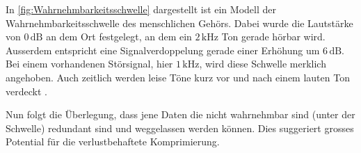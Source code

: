 \begin{refsection}
In \autoref{fig:Wahrnehmbarkeitsschwelle} dargestellt ist ein Modell der Wahrnehmbarkeitsschwelle des menschlichen Gehörs.
%
%
Dabei wurde die Lautstärke von $0\,\text{dB}$ an dem Ort festgelegt, an dem ein $2\,\text{kHz}$ Ton gerade hörbar wird.
%
Ausserdem entspricht eine Signalverdoppelung gerade einer Erhöhung um $6\,\text{dB}$. 
Bei einem vorhandenen Störsignal, hier $1\,\text{kHz}$, wird diese Schwelle merklich angehoben.
Auch zeitlich werden leise Töne kurz vor und nach einem lauten Ton verdeckt \cite{wikipedia:Psychoakustik}.

Nun folgt die Überlegung, dass jene Daten die nicht wahrnehmbar sind (unter der Schwelle) redundant sind und weggelassen werden können.
Dies suggeriert grosses Potential für die verlustbehaftete Komprimierung.


\end{refsection}
